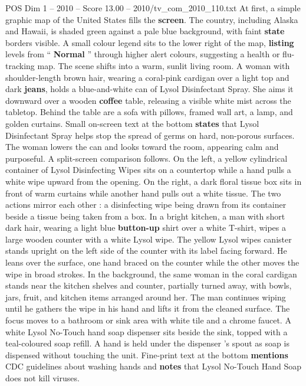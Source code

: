 \begin{textsample}{POS Dim 1 – 2010 – Score 13.00 – 2010/tv\_com\_2010\_110.txt}  \label{ex:f1_pos_030}
At first, a simple graphic map of the United States fills the \textbf{screen}.
The country, including Alaska and Hawaii, is shaded green against a pale blue background, with faint \textbf{state} borders visible.
A small colour legend sits to the lower right of the map, \textbf{listing} levels from “ \textbf{Normal} ” through higher alert colours, suggesting a health or flu-tracking map.
The scene shifts into a warm, sunlit living room.
A woman with shoulder-length brown hair, wearing a coral-pink cardigan over a light top and dark \textbf{jeans}, holds a blue-and-white can of Lysol Disinfectant Spray.
She aims it downward over a wooden \textbf{coffee} table, releasing a visible white mist across the tabletop.
Behind the table are a sofa with pillows, framed wall art, a lamp, and golden curtains.
Small on-screen text at the bottom \textbf{states} that Lysol Disinfectant Spray helps stop the spread of germs on hard, non-porous surfaces.
The woman lowers the can and looks toward the room, appearing calm and purposeful.
A split-screen comparison follows.
On the left, a yellow cylindrical container of Lysol Disinfecting Wipes sits on a countertop while a hand pulls a white wipe upward from the opening.
On the right, a dark floral tissue box sits in front of warm curtains while another hand pulls out a white tissue.
The two actions mirror each other : a disinfecting wipe being drawn from its container beside a tissue being taken from a box.
In a bright kitchen, a man with short dark hair, wearing a light blue \textbf{button-up} shirt over a white T-shirt, wipes a large wooden counter with a white Lysol wipe.
The yellow Lysol wipes canister stands upright on the left side of the counter with its label facing forward.
He leans over the surface, one hand braced on the counter while the other moves the wipe in broad strokes.
In the background, the same woman in the coral cardigan stands near the kitchen shelves and counter, partially turned away, with bowls, jars, fruit, and kitchen items arranged around her.
The man continues wiping until he gathers the wipe in his hand and lifts it from the cleaned surface.
The focus moves to a bathroom or sink area with white tile and a chrome faucet.
A white Lysol No-Touch hand soap dispenser sits beside the sink, topped with a teal-coloured soap refill.
A hand is held under the dispenser ’s spout as soap is dispensed without touching the unit.
Fine-print text at the bottom \textbf{mentions} CDC guidelines about washing hands and \textbf{notes} that Lysol No-Touch Hand Soap does not kill viruses.

\end{textsample}
